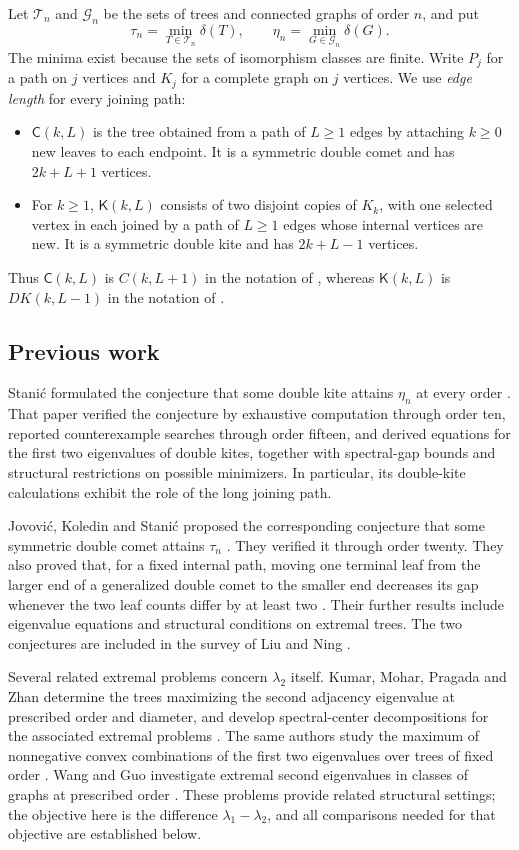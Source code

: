 \documentclass[11pt,a4paper]{article}
\numberwithin{equation}{section}
\theoremstyle{definition}
\theoremstyle{remark}
\newcommand{\Comet}{\mathsf{C}}
\newcommand{\Kite}{\mathsf{K}}
\begin{document}
Let $\mathcal T_n$ and $\mathcal G_n$ be the sets of trees and connected
graphs of order $n$, and put
\[
 \tau_n=\min_{T\in\mathcal T_n}\delta(T),\qquad
 \eta_n=\min_{G\in\mathcal G_n}\delta(G).
\]
The minima exist because the sets of isomorphism classes are finite.
Write $P_j$ for a path on $j$ vertices and $K_j$ for a complete graph on
$j$ vertices. We use \emph{edge length} for every joining path:
\begin{itemize}
\item $\Comet(k,L)$ is the tree obtained from a path of $L\ge1$ edges by
attaching $k\ge0$ new leaves to each endpoint. It is a symmetric double
comet and has $2k+L+1$ vertices.
\item For $k\ge1$, $\Kite(k,L)$ consists of two disjoint copies of $K_k$, with one
selected vertex in each joined by a path of $L\ge1$ edges whose internal
vertices are new. It is a symmetric double kite and has $2k+L-1$ vertices.
\end{itemize}
Thus $\Comet(k,L)$ is $C(k,L+1)$ in the notation of
\citet{JKS2018}, whereas $\Kite(k,L)$ is $DK(k,L-1)$ in the notation of
\citet{Stanic2013}.

\subsection{Previous work}
Stani\'c formulated the conjecture that some double kite attains $\eta_n$
at every order \citep[Conjecture~2.1]{Stanic2013}. That paper verified the
conjecture by exhaustive computation through order ten, reported
counterexample searches through order fifteen, and derived equations for
the first two eigenvalues of double kites, together with spectral-gap
bounds and structural restrictions on possible minimizers. In particular,
its double-kite calculations exhibit the role of the long joining path.

Jovovi\'c, Koledin and Stani\'c proposed the corresponding conjecture that
some symmetric double comet attains $\tau_n$
\citep[Conjecture~2.1]{JKS2018}. They verified it through order twenty.
They also proved that, for a fixed internal path, moving one terminal
leaf from the larger end of a generalized double comet to the smaller
end decreases its gap whenever the two leaf counts differ by at least
two \citep[Theorem~2.3]{JKS2018}. Their further results include eigenvalue
equations and structural conditions on extremal trees. The two
conjectures are included in the survey of Liu and Ning
\citep{LiuNing2023}.

Several related extremal problems concern $\lambda_2$ itself.
Kumar, Mohar, Pragada and Zhan determine the trees maximizing the second
adjacency eigenvalue at prescribed order and diameter, and develop
spectral-center decompositions for the associated extremal problems
\citep{KMPZDiameter}. The same authors study the maximum of nonnegative
convex combinations of the first two eigenvalues over trees of fixed
order \citep{KMPZConvex}. Wang and Guo investigate
extremal second eigenvalues in classes of graphs at prescribed order
\citep{WangGuo2026}. These problems provide related structural settings;
the objective here is the difference $\lambda_1-\lambda_2$, and all
comparisons needed for that objective are established below.
\end{document}
